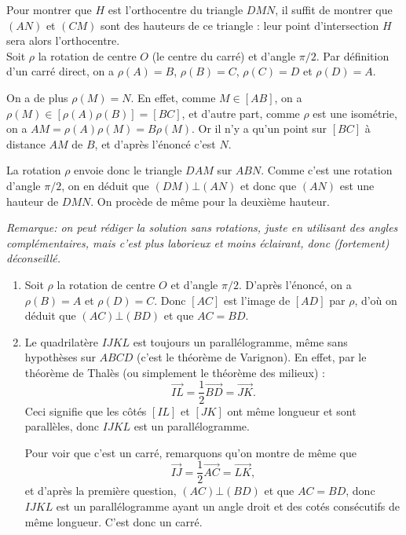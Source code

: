 \begin{Soln}{63}
Pour montrer que $H$ est l'orthocentre du triangle $DMN$, il suffit de montrer que  $(AN)$ et $(CM)$ sont des hauteurs de ce triangle : leur point d'intersection $H$ sera alors l'orthocentre.\\

Soit $\rho$ la rotation de centre $O$ (le centre du carré) et d'angle $\pi/2$. Par définition d'un carré direct, on a $\rho(A)=B$, $\rho(B)=C$, $\rho(C)=D$ et $\rho(D)=A$.

On a de plus \underline{$\rho(M)=N$}. En effet, comme $M \in [AB]$, on a $\rho(M) \in [\rho(A)\rho(B)] = [BC]$, et d'autre part, comme $\rho$ est une isométrie, on a $AM = \rho(A)\rho(M) =  B\rho(M)$. Or il n'y a qu'un point sur $[BC]$ à distance $AM$ de $B$, et d'après l'énoncé c'est $N$.

La rotation $\rho$ envoie donc le triangle $DAM$ sur $ABN$. Comme c'est une rotation d'angle $\pi/2$, on en déduit que $(DM)\bot (AN)$ et donc que $(AN)$ est une hauteur de $DMN$. On procède de même pour la deuxième hauteur.

\emph{Remarque: on peut rédiger la solution sans rotations, juste en utilisant des angles complémentaires, mais c'est plus laborieux et moins éclairant, donc (fortement) déconseillé.}
\end{Soln}
\begin{Soln}{67}
\begin{enumerate}
\item Soit $\rho$ la rotation de centre $O$ et d'angle $\pi/2$. D'après l'énoncé, on a $\rho(B)=A$ et $\rho(D)=C$. Donc $[AC]$ est l'image de $[AD]$ par $\rho$, d'où on déduit que $(AC)\bot (BD)$ et que $AC=BD$.

\item Le quadrilatère $IJKL$ est toujours un parallélogramme, même sans hypothèses sur $ABCD$ (c'est le théorème de Varignon). En effet, par le théorème de Thalès (ou simplement le théorème des milieux) :
\[ \overrightarrow{IL} = \frac12 \overrightarrow{BD} = \overrightarrow{JK}.\]
Ceci signifie que les côtés $[IL]$ et $[JK]$ ont même longueur et sont parallèles, donc $IJKL$ est un parallélogramme.

Pour voir que c'est un carré, remarquons qu'on montre de même que
\[ \overrightarrow{IJ} = \frac12 \overrightarrow{AC} = \overrightarrow{LK},\]
et d'après la première question, $(AC)\bot (BD)$ et que $AC=BD$, donc $IJKL$ est un parallélogramme ayant un angle droit et des cotés consécutifs de même longueur. C'est donc un carré.
\end{enumerate}
\end{Soln}
